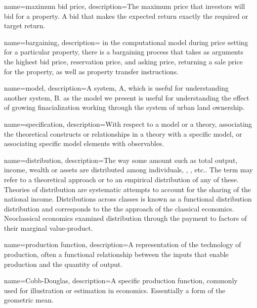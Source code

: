 {
name=maximum bid price,
description={The maximum price that investors will bid for a property. A bid that makes the expected return exactly the required or  target return.}
}

{
name=bargaining,
description= {in the computational model during price setting for a particular property, there is a bargaining process that takes as arguments the highest bid price, reservation price, and asking price, returning a sale price for the property, as well as property transfer instructions.}
}


{
name=model,
description={A system, A, which is useful for understanding another system, B. as the model we present is useful for understanding the effect of growing finacialization working through the system of urban land ownership.}
}

{
name=specification,
description={With respect to a model or a theory, associating the theoretical constructs or relationships in a theory with a specific model, or associating specific model elements with observables.}
}

{
name=distribution,
description={The way some amount such as total \gls{output}, income, \gls{wealth} or assets are distributed among individuals, , , etc.. The term may refer to a theoretical approach or to an empirical distribution of any of these. Theories of distribution are systematic attempts to account for the sharing of the national income.  Distributions across classes is known as a functional distribution distribution and  corresponds to the the approach of the \gls{classical economics}. Neoclassical economics examined distribution through the payment to factors of their \gls{marginal value-product}.}
}

{
name=production function,
description={A representation of the technology of production, often a functional relationship between the \glspl{input} that enable production and the quantity of \gls{output}.}
}

{
name=Cobb-Douglas,
description={A specific production function, commonly used for illustration or estimation in economics. Essentially a form of the geometric mean.}
}

